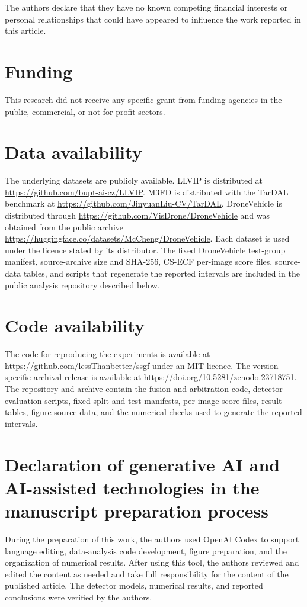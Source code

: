 \documentclass[preprint,11pt]{elsarticle}
\begin{document}
The authors declare that they have no known competing financial interests or
personal relationships that could have appeared to influence the work reported
in this article.

\section*{Funding}

This research did not receive any specific grant from funding agencies in the
public, commercial, or not-for-profit sectors.

\section*{Data availability}

The underlying datasets are publicly available. LLVIP is distributed at
\url{https://github.com/bupt-ai-cz/LLVIP}. M3FD is distributed with the TarDAL
benchmark at \url{https://github.com/JinyuanLiu-CV/TarDAL}. DroneVehicle is
distributed through \url{https://github.com/VisDrone/DroneVehicle} and was
obtained from the public archive
\url{https://huggingface.co/datasets/McCheng/DroneVehicle}. Each dataset is used
under the licence stated by its distributor. The fixed DroneVehicle test-group
manifest, source-archive size and SHA-256, CS-ECF per-image score files,
source-data tables, and scripts that regenerate the reported intervals are
included in the public analysis repository described below.

\section*{Code availability}

The code for reproducing the experiments is available at
\url{https://github.com/lessThanbetter/ssgf} under an MIT licence. The
version-specific archival release is available at
\url{https://doi.org/10.5281/zenodo.23718751}. The repository and archive contain
the fusion and arbitration code, detector-evaluation scripts, fixed split and
test manifests, per-image score files, result tables, figure source data, and
the numerical checks used to generate the reported intervals.

\section*{Declaration of generative AI and AI-assisted technologies in the
manuscript preparation process}

During the preparation of this work, the authors used OpenAI Codex to support
language editing, data-analysis code development, figure preparation, and the
organization of numerical results. After using this tool, the authors reviewed
and edited the content as needed and take full responsibility for the content
of the published article. The detector models, numerical results, and reported
conclusions were verified by the authors.



\end{document}
